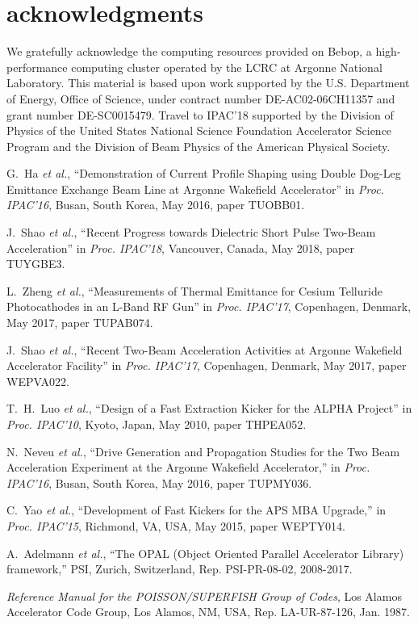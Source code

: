 \documentclass[letterpaper,  %
              ]{jacow-2_3}   %
\begin{document}
\section{acknowledgments}
We gratefully acknowledge the computing resources
provided on Bebop, a high-performance computing cluster
operated by the LCRC at Argonne National Laboratory.
This material is based upon work supported by the 
U.S. Department of Energy, Office of Science, under 
contract number DE-AC02-06CH11357 and grant number DE-SC0015479. 
Travel to IPAC'18 supported by the Division of Physics 
of the United States National Science Foundation 
Accelerator Science Program and the Division of 
Beam Physics of the American Physical Society.


\begin{thebibliography}{9}
G.~Ha \emph{et al.}, “Demonstration of Current Profile 
Shaping using Double Dog-Leg Emittance Exchange Beam 
Line at Argonne Wakefield Accelerator”
in \textit{Proc. IPAC’16}, 
Busan, South Korea, May 2016, 
paper TUOBB01.

J.~Shao \emph{et al.}, 
“Recent Progress towards Dielectric Short Pulse Two-Beam Acceleration”
in \textit{Proc. IPAC’18}, 
Vancouver, Canada, May 2018, 
paper TUYGBE3.

L.~Zheng \emph{et al.}, “Measurements of Thermal Emittance 
for Cesium Telluride Photocathodes in an L-Band RF Gun”
in \textit{Proc. IPAC’17}, 
Copenhagen, Denmark, May 2017, 
paper TUPAB074.

J.~Shao \emph{et al.}, “Recent Two-Beam 
Acceleration Activities at Argonne Wakefield Accelerator Facility”
in \textit{Proc. IPAC’17}, 
Copenhagen, Denmark, May 2017, 
paper WEPVA022.

T.~H.~Luo \emph{et al.}, “Design of a Fast
Extraction Kicker for the ALPHA Project”
in \textit{Proc. IPAC’10}, 
Kyoto, Japan, May 2010, 
paper THPEA052.

N.~Neveu \emph{et al.}, 
“Drive Generation and Propagation Studies for the Two
Beam Acceleration Experiment at the Argonne Wakefield
Accelerator,”
in \emph{Proc. IPAC'16}, 
Busan, South Korea, May 2016, 
paper TUPMY036.

C.~Yao \emph{et al.}, 
“Development of Fast Kickers for the APS
MBA Upgrade,”
in \emph{Proc. IPAC'15}, 
Richmond, VA, USA, May 2015, 
paper WEPTY014.



A.~Adelmann \emph{et al.},
“The OPAL (Object Oriented Parallel Accelerator Library) framework,”
PSI, Zurich, Switzerland,
Rep. PSI-PR-08-02, 2008-2017.

\emph{Reference Manual for the POISSON/SUPERFISH Group of 
	Codes},  Los Alamos Accelerator Code Group,  
 Los Alamos, NM, USA, 
 Rep. LA-UR-87-126, Jan. 1987.
\end{thebibliography}
\end{document}
